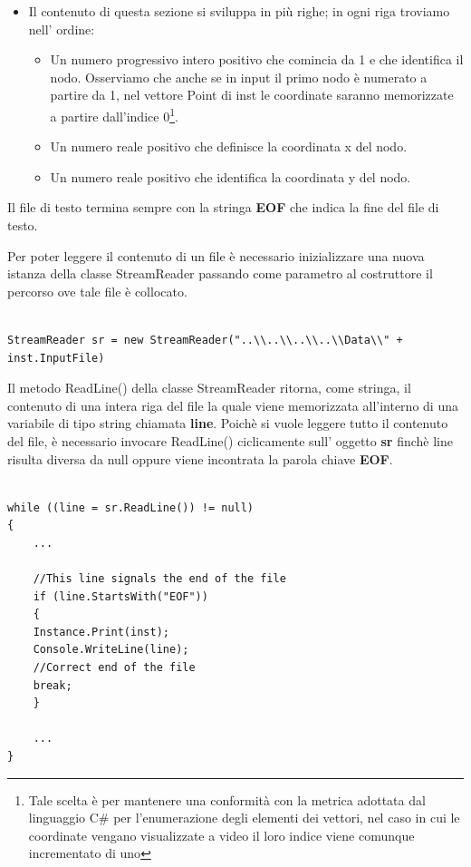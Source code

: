\documentclass[11pt]{article}
\begin{document}
\begin{itemize}
\begin{itemize}
    \item Il contenuto di questa sezione si sviluppa in più righe; in ogni riga troviamo nell' ordine:
    \begin{itemize}
    \item Un numero progressivo intero positivo che comincia da 1 e che identifica il nodo. Osserviamo che anche se in input il primo nodo è numerato a partire da 1, nel vettore Point di inst le coordinate saranno memorizzate a partire dall'indice 0\footnote{Tale scelta è per mantenere una conformità con la metrica adottata dal linguaggio C\# per l'enumerazione degli elementi dei vettori, nel caso in cui le coordinate vengano visualizzate a video il loro indice viene comunque incrementato di uno}.
    \item Un numero reale positivo che definisce la coordinata x del nodo.
    \item Un numero reale positivo che identifica la coordinata y del nodo.
    \end{itemize}        
    \end{itemize}    
\end{itemize}

Il file di testo termina sempre con la stringa \textbf{EOF} che indica la fine del file di testo.

Per poter leggere il contenuto di un file è necessario inizializzare una nuova istanza della classe StreamReader passando come parametro al costruttore il percorso ove tale file è  collocato.


\begin{lstlisting}

StreamReader sr = new StreamReader("..\\..\\..\\..\\Data\\" + inst.InputFile)

\end{lstlisting}


Il metodo ReadLine() della classe StreamReader ritorna, come stringa, il contenuto di una intera riga del file la quale viene memorizzata all'interno di una variabile di tipo string chiamata \textbf{line}. Poichè si vuole leggere tutto il contenuto del file, è necessario invocare ReadLine() ciclicamente sull' oggetto \textbf{sr} finchè line risulta diversa da null oppure viene incontrata la parola chiave \textbf{EOF}.

\begin{lstlisting}

while ((line = sr.ReadLine()) != null)
{
    ...
    
    //This line signals the end of the file
    if (line.StartsWith("EOF"))
    {
    Instance.Print(inst);
    Console.WriteLine(line);
    //Correct end of the file
    break;
    }
    
    ...
}
\end{lstlisting}
\end{document}
